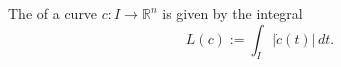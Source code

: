 The  of a curve $c: I \rightarrow \mathbb{R}^n$ is given by the integral $$L(c) := \int_I |\dot{c}(t)| \, dt.$$
